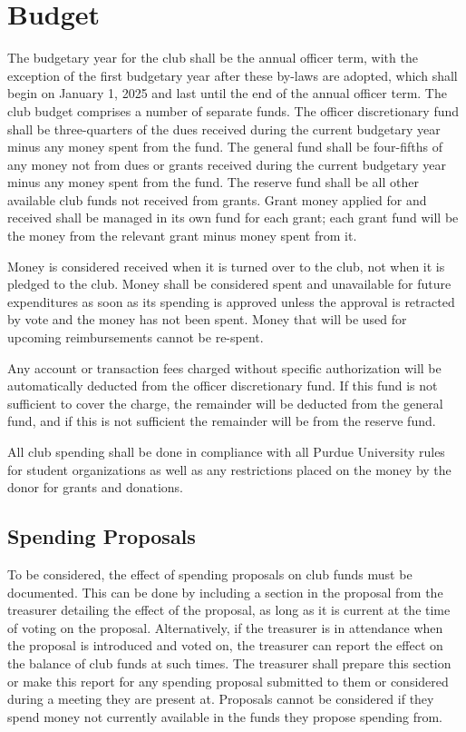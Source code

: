 \documentclass{article}
\begin{document}
\section{Budget}

The budgetary year for the club shall be the annual officer term, with the
exception of the first budgetary year after these by-laws are adopted, which
shall begin on January 1, 2025 and last until the end of the annual officer
term. The club budget comprises a number of separate funds. The officer
discretionary fund shall be three-quarters of the dues received during the
current budgetary year minus any money spent from the fund. The general fund
shall be four-fifths of any money not from dues or grants received during the
current budgetary year minus any money spent from the fund. The reserve fund
shall be all other available club funds not received from grants. Grant money
applied for and received shall be managed in its own fund for each grant; each
grant fund will be the money from the relevant grant minus money spent from it.

Money is considered received when it is turned over to the club, not when it is
pledged to the club. Money shall be considered spent and unavailable for future
expenditures as soon as its spending is approved unless the approval is
retracted by vote and the money has not been spent. Money that will be used for
upcoming reimbursements cannot be re-spent.

Any account or transaction fees charged without specific authorization will be
automatically deducted from the officer discretionary fund. If this fund is not
sufficient to cover the charge, the remainder will be deducted from the general
fund, and if this is not sufficient the remainder will be from the reserve fund.

All club spending shall be done in compliance with all Purdue University rules
for student organizations as well as any restrictions placed on the money by the
donor for grants and donations.

\subsection{Spending Proposals}

To be considered, the effect of spending proposals on club funds must be
documented. This can be done by including a section in the proposal from the
treasurer detailing the effect of the proposal, as long as it is current at the
time of voting on the proposal. Alternatively, if the treasurer is in attendance
when the proposal is introduced and voted on, the treasurer can report the
effect on the balance of club funds at such times. The treasurer shall prepare
this section or make this report for any spending proposal submitted to them or
considered during a meeting they are present at. Proposals cannot be considered
if they spend money not currently available in the funds they propose spending
from.
\end{document}
